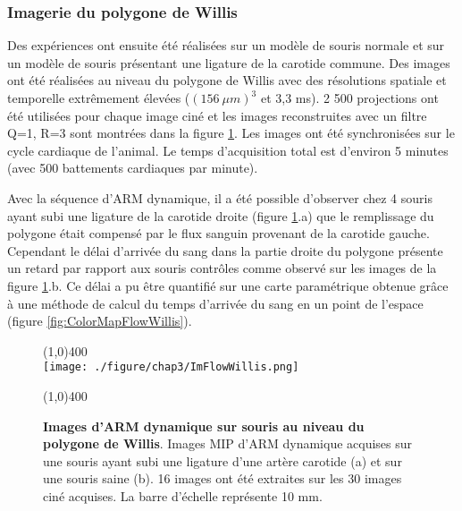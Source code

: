 \subsubsection{Imagerie du polygone de Willis}


Des expériences ont ensuite été réalisées sur un modèle de souris normale et sur un modèle de souris présentant une ligature de la carotide commune. Des images ont été réalisées au niveau du polygone de Willis avec des résolutions spatiale et temporelle extrêmement élevées ($(156 \ \mu m)^3$ et 3,3 ms). 2 500 projections ont été utilisées pour chaque image ciné et les images reconstruites avec un filtre Q=1, R=3 sont montrées dans la figure \ref{fig:ImFlowWillis}. Les images ont été synchronisées sur le cycle cardiaque de l'animal. Le temps d'acquisition total est d'environ 5 minutes (avec 500 battements cardiaques par minute).

Avec la séquence d'ARM dynamique, il a été possible d'observer chez 4 souris ayant subi une ligature de la carotide droite (figure \ref{fig:ImFlowWillis}.a) que le remplissage du polygone était compensé par le flux sanguin provenant de la carotide gauche. Cependant le délai d'arrivée du sang dans la partie droite du polygone présente un retard par rapport aux souris contrôles comme observé sur les images de la figure \ref{fig:ImFlowWillis}.b.
Ce délai a pu être quantifié sur une carte paramétrique obtenue grâce à une méthode de calcul du temps d'arrivée du sang en un point de l'espace (figure \ref{fig:ColorMapFlowWillis}).

\begin{figure}[H]
\centering \line(1,0){400} \\
\texttt{[image: ./figure/chap3/ImFlowWillis.png]}
\caption[Images d'ARM dynamique sur souris au niveau du polygone de Willis.]{\label{fig:ImFlowWillis} \textbf{Images d'ARM dynamique sur souris au niveau du polygone de Willis}. Images MIP d'ARM dynamique acquises sur une souris ayant subi une ligature d'une artère carotide (a) et sur une souris saine (b). 16 images ont été extraites sur les 30 images ciné acquises. La barre d'échelle représente 10 mm.}
\line(1,0){400} \\ \end{figure}

